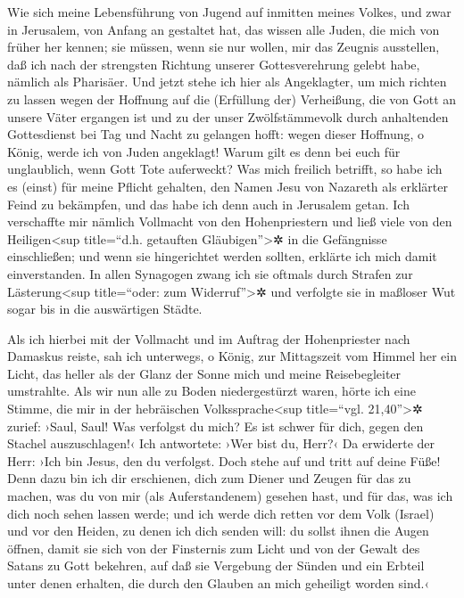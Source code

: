  Wie sich meine Lebensführung von Jugend auf inmitten
meines Volkes, und zwar in Jerusalem, von Anfang an gestaltet hat, das
wissen alle Juden,  die mich von früher her kennen; sie
müssen, wenn sie nur wollen, mir das Zeugnis ausstellen, daß ich nach
der strengsten Richtung unserer Gottesverehrung gelebt habe, nämlich als
Pharisäer.  Und jetzt stehe ich hier als Angeklagter, um
mich richten zu lassen wegen der Hoffnung auf die (Erfüllung der)
Verheißung, die von Gott an unsere Väter ergangen ist  und
zu der unser Zwölfstämmevolk durch anhaltenden Gottesdienst bei Tag und
Nacht zu gelangen hofft: wegen dieser Hoffnung, o König, werde ich von
Juden angeklagt!  Warum gilt es denn bei euch für
unglaublich, wenn Gott Tote auferweckt?  Was mich freilich
betrifft, so habe ich es (einst) für meine Pflicht gehalten, den Namen
Jesu von Nazareth als erklärter Feind zu bekämpfen,  und
das habe ich denn auch in Jerusalem getan. Ich verschaffte mir nämlich
Vollmacht von den Hohenpriestern und ließ viele von den
Heiligen\textless sup title=``d.h. getauften Gläubigen''\textgreater✲ in
die Gefängnisse einschließen; und wenn sie hingerichtet werden sollten,
erklärte ich mich damit einverstanden.  In allen
Synagogen zwang ich sie oftmals durch Strafen zur Lästerung\textless sup
title=``oder: zum Widerruf''\textgreater✲ und verfolgte sie in maßloser
Wut sogar bis in die auswärtigen Städte.

 Als ich hierbei mit der Vollmacht und im Auftrag der
Hohenpriester nach Damaskus reiste,  sah ich unterwegs, o
König, zur Mittagszeit vom Himmel her ein Licht, das heller als der
Glanz der Sonne mich und meine Reisebegleiter umstrahlte.
 Als wir nun alle zu Boden niedergestürzt waren, hörte
ich eine Stimme, die mir in der hebräischen Volkssprache\textless sup
title=``vgl. 21,40''\textgreater✲ zurief: ›Saul, Saul! Was verfolgst du
mich? Es ist schwer für dich, gegen den Stachel auszuschlagen!‹
 Ich antwortete: ›Wer bist du, Herr?‹ Da erwiderte der
Herr: ›Ich bin Jesus, den du verfolgst.  Doch stehe auf
und tritt auf deine Füße! Denn dazu bin ich dir erschienen, dich zum
Diener und Zeugen für das zu machen, was du von mir (als Auferstandenem)
gesehen hast, und für das, was ich dich noch sehen lassen werde;
 und ich werde dich retten vor dem Volk (Israel) und vor
den Heiden, zu denen ich dich senden will:  du sollst
ihnen die Augen öffnen, damit sie sich von der Finsternis zum Licht und
von der Gewalt des Satans zu Gott bekehren, auf daß sie Vergebung der
Sünden und ein Erbteil unter denen erhalten, die durch den Glauben an
mich geheiligt worden sind.‹

